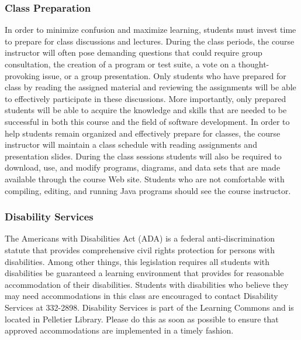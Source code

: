 \subsubsection*{Class Preparation}

% 

In order to minimize confusion and maximize learning, students must invest time to prepare for class discussions and
lectures.  During the class periods, the course instructor will often pose demanding questions that could require group
consultation, the creation of a program or test suite, a vote on a thought-provoking issue, or a group presentation.
Only students who have prepared for class by reading the assigned material and reviewing the assignments will be able to
effectively participate in these discussions.  More importantly, only prepared students will be able to acquire the
knowledge and skills that are needed to be successful in both this course and the field of software development.  In
order to help students remain organized and effectively prepare for classes, the course instructor will maintain a class
schedule with reading assignments and presentation slides.   During the class sessions students will also be required to
download, use, and modify programs, diagrams, and data sets that are made available through the course Web site.
Students who are not comfortable with compiling, editing, and running Java programs should see the course instructor.

\subsubsection*{Disability Services}

The Americans with Disabilities Act (ADA) is a federal anti-discrimination statute that provides comprehensive civil
rights protection for persons with disabilities.  Among other things, this legislation requires all students with
disabilities be guaranteed a learning environment that provides for reasonable accommodation of their disabilities.
Students with disabilities who believe they may need accommodations in this class are encouraged to contact Disability
Services at 332-2898.  Disability Services is part of the Learning Commons and is located in Pelletier Library.
Please do this as soon as possible to ensure that approved accommodations are implemented in a timely fashion.

